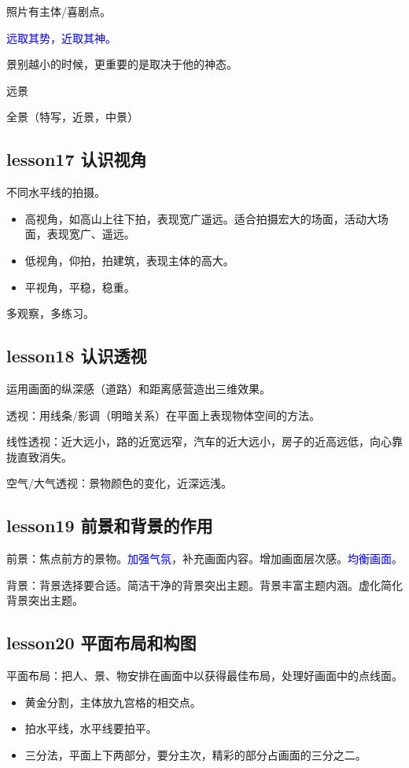 \documentclass{book}
\begin{document}
照片有主体/喜剧点。

\textcolor{blue}{远取其势，近取其神。}%

景别越小的时候，更重要的是取决于他的神态。

远景

全景（特写，近景，中景）

\subsection{lesson17 认识视角}

不同水平线的拍摄。
\begin{itemize}
  \item 高视角，如高山上往下拍，表现宽广遥远。适合拍摄宏大的场面，活动大场面，表现宽广、遥远。
  \item 低视角，仰拍，拍建筑，表现主体的高大。
  \item 平视角，平稳，稳重。
\end{itemize}

多观察，多练习。

\subsection{lesson18 认识透视}

运用画面的纵深感（道路）和距离感营造出三维效果。

透视：用线条/影调（明暗关系）在平面上表现物体空间的方法。

线性透视：近大远小，路的近宽远窄，汽车的近大远小，房子的近高远低，向心靠拢直致消失。

空气/大气透视：景物颜色的变化，近深远浅。

\subsection{lesson19 前景和背景的作用}

前景：焦点前方的景物。\textcolor{blue}{加强气氛}，补充画面内容。增加画面层次感。\textcolor{blue}{均衡画面}。

背景：背景选择要合适。简洁干净的背景突出主题。背景丰富主题内涵。虚化简化背景突出主题。

\subsection{lesson20 平面布局和构图}

平面布局：把人、景、物安排在画面中以获得最佳布局，处理好画面中的点线面。

\begin{itemize}
  \item 黄金分割，主体放九宫格的相交点。
  \item 拍水平线，水平线要拍平。
  \item 三分法，平面上下两部分，要分主次，精彩的部分占画面的三分之二。
\end{itemize}
\end{document}
